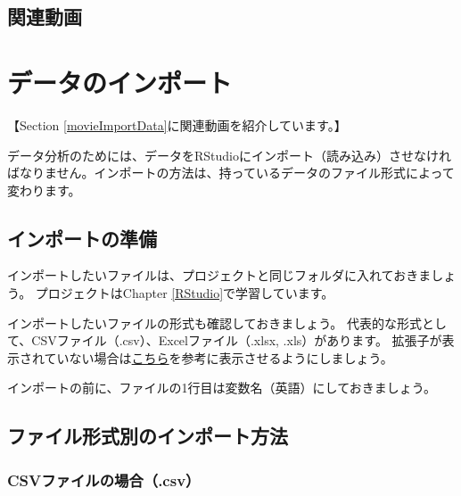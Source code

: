 \documentclass[
]{book}
\begin{document}
\hypertarget{movieRbasics}{%
\section{関連動画}\label{movieRbasics}}

\hypertarget{ImportData}{%
\chapter{データのインポート}\label{ImportData}}

【Section \ref{movieImportData}に関連動画を紹介しています。】

データ分析のためには、データをRStudioにインポート（読み込み）させなければなりません。インポートの方法は、持っているデータのファイル形式によって変わります。

\hypertarget{ux30a4ux30f3ux30ddux30fcux30c8ux306eux6e96ux5099}{%
\section{インポートの準備}\label{ux30a4ux30f3ux30ddux30fcux30c8ux306eux6e96ux5099}}

インポートしたいファイルは、プロジェクトと同じフォルダに入れておきましょう。
プロジェクトはChapter \ref{RStudio}で学習しています。

インポートしたいファイルの形式も確認しておきましょう。
代表的な形式として、CSVファイル（.csv）、Excelファイル（.xlsx, .xls）があります。
拡張子が表示されていない場合は\href{https://pc-karuma.net/windows-10-show-explorer-file-name-extension/}{こちら}を参考に表示させるようにしましょう。

インポートの前に、ファイルの1行目は変数名（英語）にしておきましょう。

\hypertarget{ux30d5ux30a1ux30a4ux30ebux5f62ux5f0fux5225ux306eux30a4ux30f3ux30ddux30fcux30c8ux65b9ux6cd5}{%
\section{ファイル形式別のインポート方法}\label{ux30d5ux30a1ux30a4ux30ebux5f62ux5f0fux5225ux306eux30a4ux30f3ux30ddux30fcux30c8ux65b9ux6cd5}}

\hypertarget{csvux30d5ux30a1ux30a4ux30ebux306eux5834ux5408.csv}{%
\subsection{CSVファイルの場合（.csv）}\label{csvux30d5ux30a1ux30a4ux30ebux306eux5834ux5408.csv}}
\end{document}
